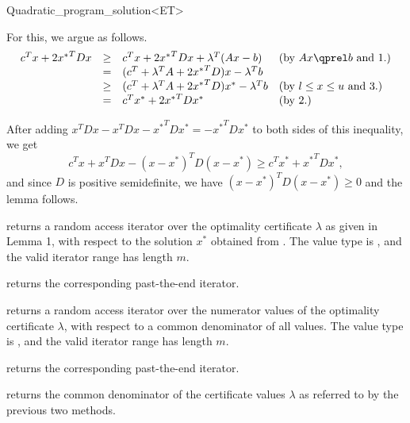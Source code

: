\begin{ccRefClass}{Quadratic_program_solution<ET>}
\begin{ccAdvanced}
For this, we argue as follows.
\[
\begin{array}{lcll}
c^Tx + 2{x^*}^TDx &\geq& c^Tx + 2{x^*}^TDx + \lambda^T(Ax-b) &  
\mbox{(by $Ax\qprel b$ and 1.)} \\
                  &=& (c^T + \lambda^T A + 2{x^*}^TD)x - \lambda^Tb \\
                  &\geq& (c^T + \lambda^T A + 2{x^*}^TD)x^* - \lambda^Tb &
\mbox{(by $l\leq x \leq u$ and 3.)} \\
                  &=& c^Tx^* + 2{x^*}^TDx^* &
\mbox{(by 2.)}
\end{array}
\]

After adding $x^TDx - x^TDx - {x^*}^TDx^* = -{x^*}^TDx^*$ to both sides of
this inequality, we get
\[
c^Tx + x^TDx - (x-x^*)^TD(x-x^*) \geq c^Tx^* + {x^*}^TDx^*,
\] 
and since $D$ is positive semidefinite, we have
$(x-x^*)^TD(x-x^*)\geq 0$ and the lemma follows.


{returns a random access iterator over the optimality certificate 
$\lambda$ as given in Lemma 1, with respect to the solution $x^*$ 
obtained from \ccVar{}. The value type
is , and the valid iterator range has length $m$.
\ccPrecond \ccVar{}}

{returns the corresponding past-the-end iterator.}

{returns a random access iterator over the numerator values
of the optimality certificate $\lambda$, with respect to a 
common denominator of all values. The value type
is , and the valid iterator range has length $m$.}

{returns the corresponding past-the-end iterator.}

{returns the common denominator of the certificate values 
$\lambda$ as referred to by the previous two methods.}

\ccExample
{}


\end{ccAdvanced}
\end{ccRefClass}
